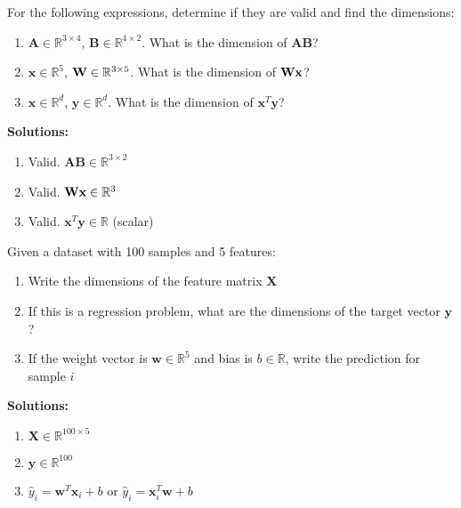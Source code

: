 \documentclass{article}
\providecommand{\vx}{\mathbf{x}}
\providecommand{\vy}{\mathbf{y}}
\providecommand{\vw}{\mathbf{w}}
\providecommand{\mX}{\mathbf{X}}
\providecommand{\mA}{\mathbf{A}}
\providecommand{\mB}{\mathbf{B}}
\providecommand{\Real}{\mathbb{R}}
\newcounter{exercise}
\begin{document}
\begin{tcolorbox}[colback=gray!5!white,colframe=gray!75!black,title=Exercise \stepcounter{exercise}\#\theexercise: Matrix Dimensions]
For the following expressions, determine if they are valid and find the dimensions:
\begin{enumerate}[label=(\alph*)]
    \item $\mA \in \Real^{3 \times 4}$, $\mB \in \Real^{4 \times 2}$. What is the dimension of $\mA\mB$?
    \item $\vx \in \Real^5$, $\mW \in \Real^{3 \times 5}$. What is the dimension of $\mW\vx$?
    \item $\vx \in \Real^d$, $\vy \in \Real^d$. What is the dimension of $\vx^T\vy$?
\end{enumerate}

\textbf{Solutions:}
\begin{enumerate}[label=(\alph*)]
    \item Valid. $\mA\mB \in \Real^{3 \times 2}$
    \item Valid. $\mW\vx \in \Real^3$
    \item Valid. $\vx^T\vy \in \Real$ (scalar)
\end{enumerate}
\end{tcolorbox}

\begin{tcolorbox}[colback=gray!5!white,colframe=gray!75!black,title=Exercise \stepcounter{exercise}\#\theexercise: ML Notation]
Given a dataset with 100 samples and 5 features:
\begin{enumerate}[label=(\alph*)]
    \item Write the dimensions of the feature matrix $\mX$
    \item If this is a regression problem, what are the dimensions of the target vector $\vy$?
    \item If the weight vector is $\vw \in \Real^5$ and bias is $b \in \Real$, write the prediction for sample $i$
\end{enumerate}

\textbf{Solutions:}
\begin{enumerate}[label=(\alph*)]
    \item $\mX \in \Real^{100 \times 5}$
    \item $\vy \in \Real^{100}$
    \item $\hat{y}_i = \vw^T \vx_i + b$ or $\hat{y}_i = \vx_i^T \vw + b$
\end{enumerate}
\end{tcolorbox}
\end{document}

